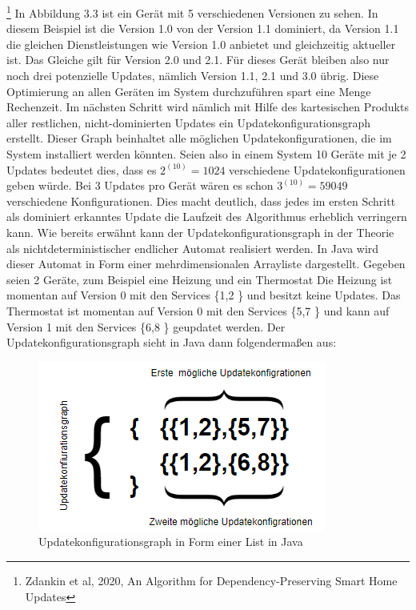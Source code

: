 \FloatBarrier
\footnote{Zdankin et al, 2020, An Algorithm for Dependency-Preserving Smart Home Updates}
In Abbildung 3.3 ist ein Gerät mit 5 verschiedenen Versionen zu sehen. In diesem Beispiel ist die Version 1.0 von der Version 1.1 dominiert,
da Version 1.1 die gleichen Dienstleistungen wie Version 1.0 anbietet und gleichzeitig aktueller ist. Das Gleiche gilt für Version 2.0 und 2.1.
Für dieses Gerät bleiben also nur noch drei potenzielle Updates, nämlich Version 1.1, 2.1 und 3.0 übrig. Diese Optimierung an allen Geräten
im System durchzuführen spart eine Menge Rechenzeit.
Im nächsten Schritt wird nämlich mit Hilfe des kartesischen Produkts aller restlichen, nicht-dominierten Updates ein Updatekonfigurationsgraph
erstellt. Dieser Graph beinhaltet alle möglichen Updatekonfigurationen, die im System installiert werden könnten. Seien also in einem System 10
Geräte mit je 2 Updates bedeutet dies, dass es \( 2^(10) = 1024\) verschiedene Updatekonfigurationen geben würde. Bei 3 Updates pro Gerät
wären es schon \( 3^(10) = 59049\) verschiedene Konfigurationen. Dies macht deutlich, dass jedes im ersten Schritt als dominiert erkanntes
Update die Laufzeit des Algorithmus erheblich verringern kann. Wie bereits erwähnt kann der Updatekonfigurationsgraph in der Theorie als
nichtdeterministischer endlicher Automat realisiert werden. In Java wird dieser Automat in Form einer mehrdimensionalen Arrayliste dargestellt.
Gegeben seien 2 Geräte, zum Beispiel eine Heizung und ein Thermostat
Die Heizung ist momentan auf Version 0 mit den Services  \{1,2 \} und besitzt keine Updates.
Das Thermostat ist momentan auf Version 0 mit den Services  \{5,7 \} und kann auf Version 1 mit den Services \{6,8 \} geupdatet werden.
Der Updatekonfigurationsgraph sieht in Java dann folgendermaßen aus:
\begin{figure}[!h]
\begin{center}
\includegraphics{"UCG Java"}
\caption{Updatekonfigurationsgraph in Form einer List in Java}
\label{fig:Prob1:MEA}
\end{center}
\end{figure}

